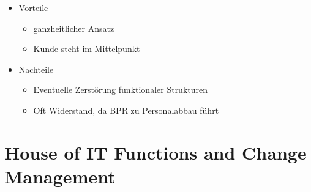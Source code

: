 \begin{itemize}
\item Vorteile
	\begin{itemize}
	\item ganzheitlicher Ansatz
	\item Kunde steht im Mittelpunkt
	\end{itemize}
	
\item Nachteile
	\begin{itemize}
	\item Eventuelle Zerstörung funktionaler Strukturen
	\item Oft Widerstand, da BPR zu Personalabbau führt
	\end{itemize}

\end{itemize}

\section{House of IT Functions and Change Management}

